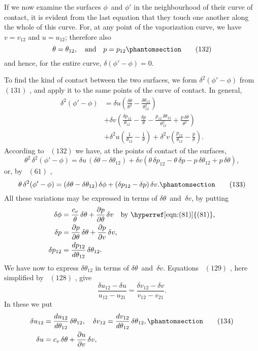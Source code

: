 \documentclass[12pt]{book}[2005/09/16]
\newcommand{\Chg}[2]{#2}
\newcommand{\Add}[1]{\Chg{}{#1}}
\newcommand{\Tag}[1]{%
  \phantomsection\label{eqn:#1}\tag*{\ensuremath{#1}}%
}
\newcommand{\Eq}[1]{%
  \hyperref[eqn:#1]{\ensuremath{#1}}%
}
\newcommand{\PageSep}[1]{\ignorespaces}
\newcommand{\dd}{\partial}
\begin{document}
If we now examine the surfaces $\phi$~and $\phi'$ in the neighbourhood
of their curve of contact, it is evident from the
last equation that they touch one another along the whole
of this curve. For, at any point of the vaporization curve,
we have $v = v_{12}$ and $u = u_{12}$; therefore also
\[
\theta = \theta_{12},\quad\text{and}\quad p = p_{12}
\Tag{(132)}
\]
and hence, for the entire curve, $\delta (\phi' - \phi) = 0$.

To find the kind of contact between the two surfaces, we
form $\delta^{2} (\phi' - \phi)$ from~\Eq{(131)}, and apply it to the same points
of the curve of contact. In general,
\begin{align*}
\delta^{2} (\phi' - \phi)
  &= \delta u \left(\frac{\delta \theta}{\theta^{2}} - \frac{\delta \theta_{12}}{\theta_{12}^{2}}\right) \\
  &+ \delta v \left(\frac{\delta p_{12}}{\theta_{12}} - \frac{\delta p}{\theta} - \frac{p_{12}\, \delta \theta_{12}}{\theta_{12}^{2}} + \frac{p\, \delta \theta}{\theta^{2}}\right) \\
  &+ \delta^{2} u \left(\frac{1}{\theta_{12}} - \frac{1}{\theta}\right)
   + \delta^{2} v \left(\frac{p_{12}}{\theta_{12}} - \frac{p}{\theta}\right).
\end{align*}
According to~\Eq{(132)} we have, at the points of contact of
the surfaces,
\[
\theta^{2}\, \delta^{2} (\phi' - \phi)
  = \delta u\, (\delta \theta - \delta \theta_{12})
  + \delta v (\theta\, \delta p_{12} - \theta\, \delta p - p\, \delta \theta_{12} + p\,\delta \theta),
\]
or, by~\Eq{(61)},
\[
\theta\, \delta^{2} (\phi' - \phi)
  = (\delta \theta - \delta \theta_{12})\, \delta \phi + (\delta p_{12} - \delta p)\, \delta v.
\Tag{(133)}
\]
All these variations may be expressed in terms of $\delta \theta$~and~$\delta v$,
by putting
\begin{align*}
\delta \phi &= \frac{c_{v}}{\theta}\, \delta \theta + \frac{\dd p}{\dd \theta}\, \delta v\quad\text{\Chg{(by 81)}{by~\Eq{(81)}}}, \\
\delta p &= \frac{\dd p}{\dd \theta}\, \delta \theta + \frac{\dd p}{\dd v}\, \delta v, \\
\delta p_{12} &= \frac{dp_{12}}{d\theta_{12}}\, \delta \theta_{12}.
\end{align*}
We have now to express $\delta \theta_{12}$ in terms of $\delta \theta$~and~$\delta v$.
Equations~\Eq{(129)}, here simplified by~\Eq{(128)}, give
\[
\frac{\delta u_{12} - \delta u}{u_{12} - u_{21}}
  = \frac{\delta v_{12} - \delta v}{v_{12} - v_{21}}.
\]
\PageSep{167}
In these we put
\begin{align*}
\delta u_{12} &= \frac{du_{12}}{d\theta_{12}}\, \delta \theta_{12},\quad
\delta v_{12}  = \frac{dv_{12}}{d\theta_{12}}\, \delta \theta_{12}\Add{,}
\Tag{(134)} \\
\delta u &= c_{v}\, \delta \theta + \frac{\dd u}{\dd v}\, \delta v,
\end{align*}
\end{document}
